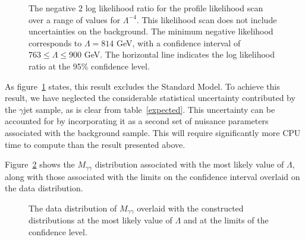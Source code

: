 \begin{figure}[htp]
\begin{minipage}[b]{.69\textwidth}
\begin{infilsf} \tiny

\end{infilsf}
\end{minipage}
\begin{minipage}[b]{.3\textwidth}
\caption{The negative 2 log likelihood ratio for the profile likelihood scan over a range of values for $\Lambda^{-4}$. This likelihood scan does not include uncertainties on the background. The minimum negative likelihood corresponds to $\Lambda=814$ GeV, with a confidence interval of $763 \le \Lambda \le 900$ GeV. The horizontal line indicates the log likelihood ratio at the 95\% confidence level.}\label{resllr}
\end{minipage}
\end{figure}

As figure~\ref{resllr} states, this result excludes the Standard Model. To achieve this result, we have neglected the considerable statistical uncertainty contributed by the $\gamma$jet sample, as is clear from table~\ref{expected}. This uncertainty can be accounted for by incorporating it as a second set of nuisance parameters associated with the background sample. This will require significantly more CPU time to compute than the result presented above.

Figure~\ref{result} shows the $M_{\gamma\gamma}$ distribution associated with the most likely value of $\Lambda$, along with those associated with the limits on the confidence interval overlaid on the data distribution.

\begin{figure}[htp]
\begin{minipage}[b]{.69\textwidth}
\begin{infilsf} \tiny

\end{infilsf}
\end{minipage}
\begin{minipage}[b]{.3\textwidth}
\caption{The data distribution of $M_{\gamma\gamma}$ overlaid with the constructed distributions at the most likely value of $\Lambda$ and at the limits of the confidence level.}\label{result}
\end{minipage}
\end{figure}